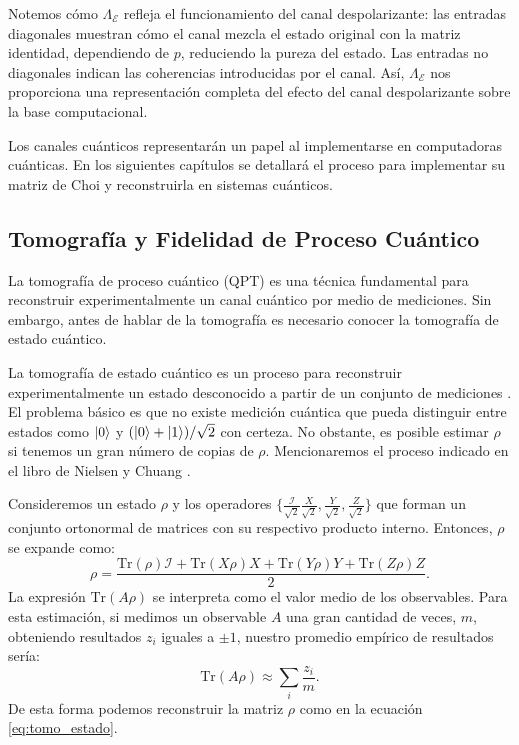 \documentclass[letterpaper,12pt]{thesisECFM}
\theoremstyle{plain}
\theoremstyle{definition}
\theoremstyle{definition}
\theoremstyle{remark}
\newcommand{\1}{\mathbb{1}}
\begin{document}
Notemos cómo $\Lambda_{\mathcal{E}}$ refleja el funcionamiento del canal despolarizante: las entradas diagonales muestran cómo el canal mezcla el estado original con la matriz identidad, dependiendo de $p$, reduciendo la pureza del estado. Las entradas no diagonales indican las coherencias introducidas por el canal. Así, $\Lambda_{\mathcal{E}}$  nos proporciona una representación completa del efecto del canal despolarizante sobre la base computacional.  

Los canales cuánticos representarán un papel al implementarse en computadoras cuánticas. En los siguientes capítulos se detallará el proceso para implementar su matriz de Choi y reconstruirla en sistemas cuánticos.

\subsection{Tomografía y Fidelidad de Proceso Cuántico} %
La tomografía de proceso cuántico (QPT) es una técnica fundamental para reconstruir experimentalmente un canal cuántico por medio de mediciones. Sin embargo, antes de hablar de la tomografía es necesario conocer la tomografía de estado cuántico.  

La tomografía de estado cuántico es un proceso para reconstruir
experimentalmente un estado desconocido a partir de un conjunto de mediciones
\cite{nielsen_chuang_2011}. El problema básico es que no existe medición
cuántica que pueda distinguir entre estados como $\ket{0}$ y
$(\ket{0}+\ket{1})/\sqrt{2}$ con certeza. No obstante, es posible estimar
$\rho$ si tenemos un gran número de copias de $\rho$. Mencionaremos el proceso
indicado en el libro de Nielsen y Chuang \cite{nielsen_chuang_2011}. 


Consideremos un estado $\rho$ y los operadores $\{\frac{\mathcal{I}}{\sqrt{2}}
\frac{X}{\sqrt{2}},  \frac{Y}{\sqrt{2}},  \frac{Z}{\sqrt{2}} \} $ que forman un
conjunto ortonormal de matrices con su respectivo producto interno. Entonces,
$\rho$ se expande como:
\begin{equation}
\label{eq:tomo_estado}
    \rho = \frac{\text{Tr}(\rho)\mathcal{I} + \text{Tr}(X\rho)X  + \text{Tr}(Y\rho)Y + \text{Tr}(Z\rho)Z}  {2}.
\end{equation}
La expresión $\text{Tr}(A\rho)$ se interpreta como el valor medio de los observables. Para esta estimación, si medimos un observable $A$ una gran cantidad de veces, $m$, obteniendo resultados $z_i$ iguales a $\pm 1$, nuestro promedio empírico de resultados sería:
\begin{equation}
    \text{Tr}(A \rho) \approx \sum_i \frac{z_i}{m}.
\end{equation}
De esta forma podemos reconstruir la matriz $\rho$ como en la ecuación \ref{eq:tomo_estado}.  
\end{document}
